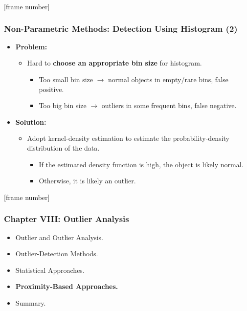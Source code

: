 \documentclass[aspectratio=169,t,xcolor=dvipsnames]{beamer}
\begin{document}
{
  [frame number]
  \begin{frame}
  	\frametitle{Non-Parametric Methods: Detection Using Histogram (2)}
  	\begin{itemize}
  		\item \textbf{Problem:}
  		      \begin{itemize}
  		      	\item Hard to \textbf{\color{airforceblue}choose an appropriate bin size} for histogram.
  		      	      \begin{itemize}
  		      	      	\item Too small bin size $\rightarrow$ normal objects in empty/rare bins, false positive.
  		      	      	\item Too big bin size $\rightarrow$ outliers in some frequent bins, false negative.
  		      	      \end{itemize}
  		      \end{itemize}
  		\item \textbf{Solution:}
  		      \begin{itemize}
  		      	\item Adopt kernel-density estimation to estimate the probability-density distribution of the data.
  		      	      \begin{itemize}
  		      	      	\item If the estimated density function is high, the object is likely normal.
  		      	      	\item Otherwise, it is likely an outlier.
  		      	      \end{itemize}
  		      \end{itemize}
  	\end{itemize}
  \end{frame}
}

{
  [frame number]
  \begin{frame}
  	\frametitle{Chapter VIII: Outlier Analysis}
  	\begin{itemize}
  		\item Outlier and Outlier Analysis.
  		\item Outlier-Detection Methods.
  		\item Statistical Approaches.
  		\item \textbf{Proximity-Based Approaches.}
  		\item Summary.
  	\end{itemize}
  \end{frame}
}
\end{document}
